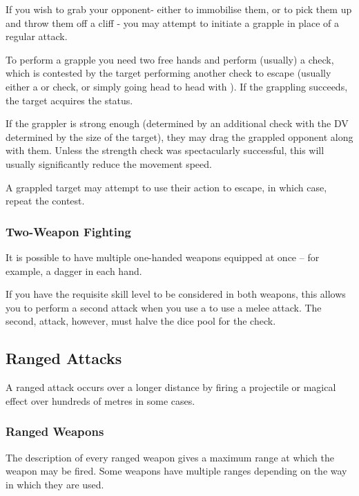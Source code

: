 If you wish to grab your opponent- either to immobilise them, or to pick them up and throw them off a cliff - you may attempt to initiate a grapple in place of a regular attack. 

To perform a grapple you need two free hands and perform (usually) a  check, which is contested by the target performing another check to escape (usually either a  or  check, or simply going head to head with ). If the grappling succeeds, the target acquires the  status. 

If the grappler is strong enough (determined by an additional  check with the DV determined by the size of the target), they may drag the grappled opponent along with them. Unless the strength check was spectacularly successful, this will usually significantly reduce the movement speed. 

A grappled target may attempt to use their action to escape, in which case, repeat the contest. 

\subsubsection{Two-Weapon Fighting}

It is possible to have multiple one-handed weapons equipped at once -- for example, a dagger in each hand. 

If you have the requisite skill level to be considered  in both weapons, this allows you to perform a second attack when you use a  to use a melee attack. The second, attack, however, must halve the dice pool for the check.


\subsection{Ranged Attacks}

A ranged attack occurs over a longer distance by firing a projectile or magical effect over hundreds of metres in some cases. 

\subsubsection{Ranged Weapons}

The description of every ranged weapon gives a maximum range at which the weapon may be fired. Some weapons have multiple ranges depending on the way in which they are used. 

